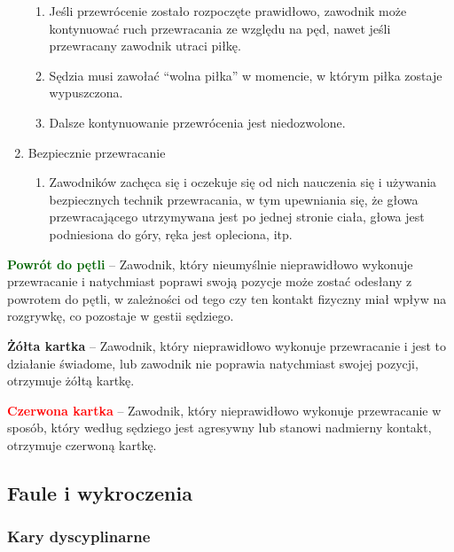 \documentclass[12pt]{article}
\newcommand\redcard[1]{\bgroup\textcolor{red}{\textbf{#1}}}
\newcommand\yellowcard[1]{\bgroup\textcolor{darkyellow}{\textbf{#1}}}
\newcommand\other[1]{\bgroup\textcolor{darkgreen}{\textbf{#1}}}
\begin{document}
\begin{enumerate}
	      \begin{enumerate}
		      \item
		            Jeśli przewrócenie zostało rozpoczęte prawidłowo, zawodnik może
		            kontynuować ruch przewracania ze względu na pęd, nawet jeśli
		            przewracany zawodnik utraci piłkę.
		      \item
		            Sędzia musi zawołać ``wolna piłka'' w momencie, w którym piłka
		            zostaje wypuszczona.
		      \item
		            Dalsze kontynuowanie przewrócenia jest niedozwolone.
	      \end{enumerate}
	\item
	      Bezpiecznie przewracanie

	      \begin{enumerate}
		      \item
		            Zawodników zachęca się i oczekuje się od nich nauczenia się i
		            używania bezpiecznych technik przewracania, w tym upewniania się, że
		            głowa przewracającego utrzymywana jest po jednej stronie ciała,
		            głowa jest podniesiona do góry, ręka jest opleciona, itp.
	      \end{enumerate}
\end{enumerate}

\other{Powrót do pętli} -- Zawodnik, który nieumyślnie nieprawidłowo
wykonuje przewracanie i natychmiast poprawi swoją pozycje może zostać
odesłany z powrotem do pętli, w zależności od tego czy ten kontakt
fizyczny miał wpływ na rozgrywkę, co pozostaje w gestii sędziego.

\yellowcard{Żółta kartka} -- Zawodnik, który nieprawidłowo wykonuje
przewracanie i jest to działanie świadome, lub zawodnik nie poprawia
natychmiast swojej pozycji, otrzymuje żółtą kartkę.

\redcard{Czerwona kartka} -- Zawodnik, który nieprawidłowo wykonuje
przewracanie w sposób, który według sędziego jest agresywny lub stanowi
nadmierny kontakt, otrzymuje czerwoną kartkę.

\subsection{Faule i wykroczenia}

\subsubsection{Kary dyscyplinarne}
\end{document}
